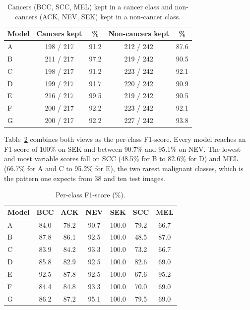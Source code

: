 \documentclass[conference]{IEEEtran}
\begin{document}
\begin{table}[!t]
\caption{Cancers (BCC, SCC, MEL) kept in a cancer class and non-cancers (ACK, NEV, SEK) kept in a non-cancer class.}
\label{tab:risk}
\centering\scriptsize\setlength{\tabcolsep}{3pt}
\begin{tabular}{lcccc}
\toprule
Model & Cancers kept & \% & Non-cancers kept & \% \\
\midrule
A & 198 / 217 & 91.2 & 212 / 242 & 87.6 \\
B & 211 / 217 & 97.2 & 219 / 242 & 90.5 \\
C & 198 / 217 & 91.2 & 223 / 242 & 92.1 \\
D & 199 / 217 & 91.7 & 220 / 242 & 90.9 \\
E & 216 / 217 & 99.5 & 219 / 242 & 90.5 \\
F & 200 / 217 & 92.2 & 223 / 242 & 92.1 \\
G & 200 / 217 & 92.2 & 227 / 242 & 93.8 \\
\bottomrule
\end{tabular}
\end{table}


Table~\ref{tab:f1} combines both views as the per-class F1-score. Every model reaches an F1-score of 100\% on SEK and between 90.7\% and 95.1\% on NEV. The lowest and most variable scores fall on SCC (48.5\% for B to 82.6\% for D) and MEL (66.7\% for A and C to 95.2\% for E), the two rarest malignant classes, which is the pattern one expects from 38 and ten test images.

\begin{table}[!t]
\caption{Per-class F1-score (\%).}
\label{tab:f1}
\centering\scriptsize\setlength{\tabcolsep}{3pt}
\begin{tabular}{lcccccc}
\toprule
Model & BCC & ACK & NEV & SEK & SCC & MEL \\
\midrule
A & 84.0 & 78.2 & 90.7 & 100.0 & 79.2 & 66.7 \\
B & 87.8 & 86.1 & 92.5 & 100.0 & 48.5 & 87.0 \\
C & 83.9 & 84.2 & 93.3 & 100.0 & 73.2 & 66.7 \\
D & 85.8 & 82.9 & 92.5 & 100.0 & 82.6 & 69.0 \\
E & 92.5 & 87.8 & 92.5 & 100.0 & 67.6 & 95.2 \\
F & 84.4 & 84.8 & 93.3 & 100.0 & 70.0 & 69.0 \\
G & 86.2 & 87.2 & 95.1 & 100.0 & 79.5 & 69.0 \\
\bottomrule
\end{tabular}
\end{table}
\end{document}
